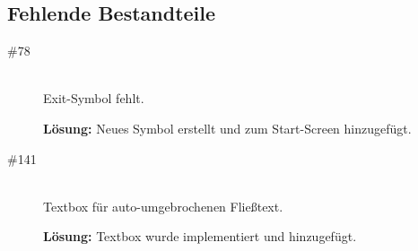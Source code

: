%



\subsection*{Fehlende Bestandteile}
\begin{description}

\item[\#78] \hfill \\
\glqq Exit\grqq-Symbol fehlt.
 
{\bfseries Lösung:} Neues Symbol erstellt und zum Start-Screen hinzugefügt.
 
 
\item[\#141] \hfill \\
Textbox für auto-umgebrochenen Fließtext.
 
{\bfseries Lösung:} Textbox wurde implementiert und hinzugefügt.

\end{description}
~\\